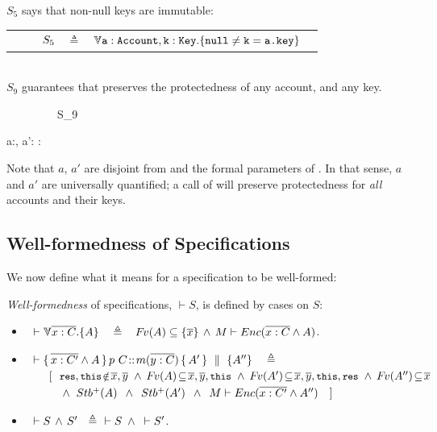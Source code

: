 {
 \begin{example}
 \label{example:twostate}
 \label{example:mprepostl}
 $S_5$  says %
  that   non-null keys are immutable:
 \\
 \begin{tabular}{lcll}
$\strut \ \ \ \ \ \ \ \ S_5$ & $\triangleq$   & ${\TwoStatesN {\prg{a}:\prg{Account},\prg{k}:\prg{Key}}  {\prg{null}\neq \prg{k}=\prg{a.\password}}} $  \end{tabular}
\\
$S_9$    guarantees that  preserves the protectedness of any account, and any key.  \\
   {\sprepost
		{\strut \ \ \ \ \ \ \ \ \ S_9} 
		{  a:, a':\wedge  {}\wedge  {} }
		{} {} {:}
		{   \wedge  {}  }
		{   \wedge  {} }
}

\noindent
Note that  $a$, $a'$ are disjoint from  and the formal parameters of . 
In that sense, $a$ and $a'$ are universally quantified; a call of  will preserve protectedness for \emph{ all} accounts and their keys. 

\end{example}

\subsection{\textbf{Well-formedness of Specifications}} We now define what it means for a specification to be well-formed:

\begin{definition}%
 {\emph{Well-formedness}} of specifications,  $\vdash S$,  is   defined by cases on $S$:
\label{f:holistic-wff}

\begin{itemize}
\item
  $\strut \  \vdash {\TwoStatesN {\overline {x:C}} {A}} \ \ \ \triangleq\  \ \ \fv(A)\subseteq\{  \overline x \}\,\wedge\, {M \vdash \encaps {{\overline {x: C}} \wedge A}} $.
    \item
 $\strut \ \vdash {\mprepostN{\overline{x:C'} \wedge A}{p\ C}{m}{y}{C}{A'} {A''}}\ \ \ \triangleq$\\
$\strut \hspace{0.7cm}  [ \ \ {\small{   {\prg{res},\prg{this}\!\notin\! \overline{x}, \overline{y}}\ \wedge\  {\fv(A)\!\subseteq\! \overline x, \overline y, \prg{this}}\     \wedge\    \fv(A')\!\subseteq \! \overline{x}, \overline{y}, \prg{this}, \prg{res}\   \wedge\   \fv(A'')\!\subseteq\!  {\overline{x}} }} $\\
    $\strut \hspace{0.7cm} \ \ \  \wedge\  {Stb^+( A  )} \, \ \wedge \ \,  {Stb^+( A' )} \, \ \wedge \  \,  M \vdash {\ensuremath Enc( \overline {x: C'} \wedge A'' )}\ \ \  ]$ 
  \item  $\strut \   \vdash S\, \wedge \, S' \ \ \triangleq \ \  \vdash S\, \ \wedge\,  \ \vdash S'  $.  
\end{itemize}


\end{definition}}
